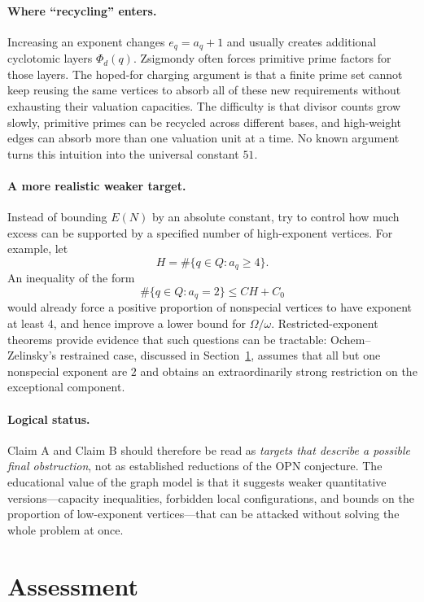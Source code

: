 \documentclass[11pt]{article}
\theoremstyle{definition}
\theoremstyle{remark}
\begin{document}
\paragraph{Where ``recycling'' enters.}
Increasing an exponent changes $e_q=a_q+1$ and usually creates additional
cyclotomic layers $\Phi_d(q)$.  Zsigmondy often forces primitive prime
factors for those layers.  The hoped-for charging argument is that a finite
prime set cannot keep reusing the same vertices to absorb all of these new
requirements without exhausting their valuation capacities.  The difficulty
is that divisor counts grow slowly, primitive primes can be recycled across
different bases, and high-weight edges can absorb more than one valuation
unit at a time.  No known argument turns this intuition into the universal
constant $51$.

\paragraph{A more realistic weaker target.}
Instead of bounding $E(N)$ by an absolute constant, try to control how much
excess can be supported by a specified number of high-exponent vertices.  For
example, let
\[
H=\#\{q\in Q:a_q\ge4\}.
\]
An inequality of the form
\[
\#\{q\in Q:a_q=2\}\le C H+C_0
\]
would already force a positive proportion of nonspecial vertices to have
exponent at least $4$, and hence improve a lower bound for
$\Omega/\omega$.  Restricted-exponent theorems provide evidence that such
questions can be tractable: Ochem--Zelinsky's restrained case, discussed in
Section~\ref{sec:assessment}, assumes that all but one nonspecial exponent are $2$ and obtains an
extraordinarily strong restriction on the exceptional component.

\paragraph{Logical status.}
Claim A and Claim B should therefore be read as \emph{targets that describe a
possible final obstruction}, not as established reductions of the OPN
conjecture.  The educational value of the graph model is that it suggests
weaker quantitative versions---capacity inequalities, forbidden local
configurations, and bounds on the proportion of low-exponent vertices---that
can be attacked without solving the whole problem at once.

\section{Assessment}\label{sec:assessment}
\end{document}
